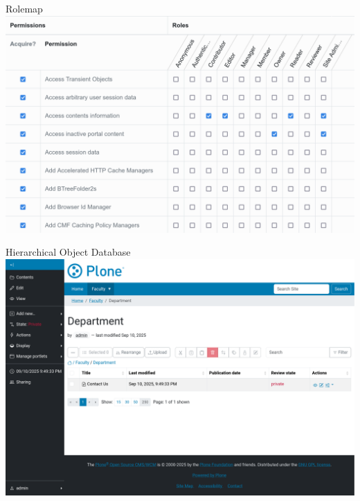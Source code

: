 \documentclass[12pt,aspectratio=169]{beamer}
\begin{document}
\begin{frame}{Rolemap}
  \includegraphics[width=0.95\columnwidth]{images/rolemap.png}
\end{frame}


\begin{frame}{Hierarchical Object Database}
  \includegraphics[width=1\columnwidth]{images/contents.png}
\end{frame}

\end{document}
